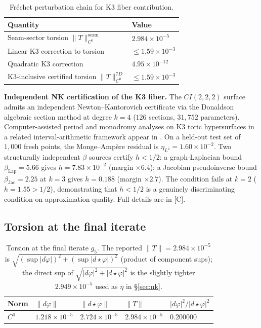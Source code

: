 \documentclass[11pt,a4paper]{article}
\theoremstyle{definition}
\theoremstyle{remark}
\newcommand{\CIvvv}{\mathrm{CI}(2,2,2)}
\def\CIvvv{CI(2,2,2)}%
\begin{document}
\begin{table}[ht]
\centering
\begin{tabular}{ll}
\toprule
Quantity & Value \\
\midrule
Seam-sector torsion $\|T\|_{C^0}^{\mathrm{seam}}$ & $2.984 \times 10^{-5}$ \\
Linear K3 correction to torsion & $\leq 1.59 \times 10^{-3}$ \\
Quadratic K3 correction & $4.95 \times 10^{-12}$ \\
K3-inclusive certified torsion $\|T\|_{C^0}^{7D}$ & $\leq 1.59 \times 10^{-3}$ \\
\bottomrule
\end{tabular}
\caption{Fr\'echet perturbation chain for K3 fiber contribution.}
\end{table}

\textbf{Independent NK certification of the K3 fiber.} The $\CIvvv$ surface admits an independent Newton--Kantorovich certificate via the Donaldson algebraic section method \cite{Donaldson2009} at degree $k=4$ ($126$ sections, $31{,}752$ parameters). Computer-assisted period and monodromy analyses on K3 toric hypersurfaces in a related interval-arithmetic framework appear in \cite{IshigeTakayasu2025}. On a held-out test set of $1{,}000$ fresh points, the Monge--Amp\`ere residual is $\eta_{L^2} = 1.60 \times 10^{-2}$. Two structurally independent $\beta$ sources certify $h < 1/2$: a graph-Laplacian bound $\beta_{\mathrm{Lap}} = 5.66$ gives $h = 7.83 \times 10^{-2}$ (margin $\times 6.4$); a Jacobian pseudoinverse bound $\beta_{\mathrm{Jac}} = 2.25$ at $k=3$ gives $h = 0.188$ (margin $\times 2.7$). The condition fails at $k=2$ ($h = 1.55 > 1/2$), demonstrating that $h < 1/2$ is a genuinely discriminating condition on approximation quality. Full details are in [C].

\subsection{Torsion at the final iterate}

\begin{table}[ht]
\centering
\begin{tabular}{lllll}
\toprule
Norm & $\|d\varphi\|$ & $\|d\star\varphi\|$ & $\|T\|$ & $|d\varphi|^2/|d\star\varphi|^2$ \\
\midrule
$C^0$ & $1.218 \times 10^{-5}$ & $2.724 \times 10^{-5}$ & $2.984 \times 10^{-5}$ & $0.200000$ \\
\bottomrule
\end{tabular}
\caption{Torsion at the final iterate $g_5$. The reported $\|T\| = 2.984 \times 10^{-5}$ is $\sqrt{(\sup|d\varphi|)^2 + (\sup|d\star\varphi|)^2}$ (product of component sups); the direct sup of $\sqrt{|d\varphi|^2 + |d\star\varphi|^2}$ is the slightly tighter $2.949 \times 10^{-5}$ used as $\eta$ in §\ref{sec:nk}.}
\label{tab:torsion_iter}
\end{table}
\end{document}
